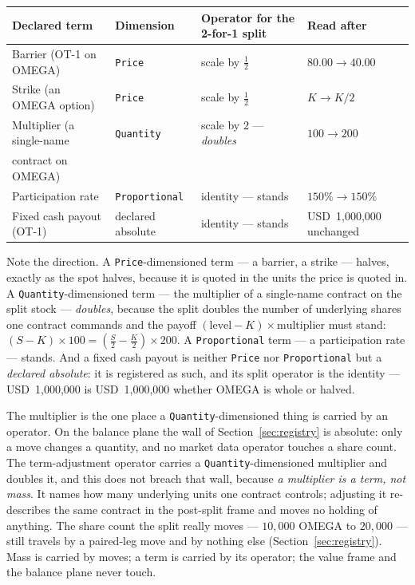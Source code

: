 \documentclass[11pt,a4paper]{article}
\newcommand{\USD}[1]{\mbox{USD~#1}}
\begin{document}
\begin{center}
\begin{tabular}{@{}llll@{}}
\toprule
Declared term & Dimension & Operator for the 2-for-1 split & Read after \\
\midrule
Barrier (OT-1 on OMEGA)          & \texttt{Price}        & scale by $\tfrac12$             & $80.00 \rightarrow 40.00$ \\
Strike (an OMEGA option)         & \texttt{Price}        & scale by $\tfrac12$             & $K \rightarrow K/2$ \\
Multiplier (a single-name        & \texttt{Quantity}     & scale by $2$ --- \emph{doubles} & $100 \rightarrow 200$ \\
\quad contract on OMEGA)         &                       &                                & \\
Participation rate               & \texttt{Proportional} & identity --- stands             & $150\% \rightarrow 150\%$ \\
Fixed cash payout (OT-1)         & declared absolute     & identity --- stands             & \USD{1{,}000{,}000} unchanged \\
\bottomrule
\end{tabular}
\end{center}

Note the direction. A \texttt{Price}-dimensioned term --- a barrier, a strike --- halves,
exactly as the spot halves, because it is quoted in the units the price is quoted in. A
\texttt{Quantity}-dimensioned term --- the multiplier of a single-name contract on the split
stock --- \emph{doubles}, because the split doubles the number of underlying shares one
contract commands and the payoff $(\text{level} - K)\times\text{multiplier}$ must stand:
$(S - K)\times 100 = (\tfrac{S}{2} - \tfrac{K}{2})\times 200$. A \texttt{Proportional} term
--- a participation rate --- stands. And a fixed cash payout is neither \texttt{Price} nor
\texttt{Proportional} but a \emph{declared absolute}: it is registered as such, and its split
operator is the identity --- \USD{1{,}000{,}000} is \USD{1{,}000{,}000} whether OMEGA is whole
or halved.

The multiplier is the one place a \texttt{Quantity}-dimensioned thing is carried by an
operator. On the balance plane the wall of Section~\ref{sec:registry} is absolute: only a
move changes a quantity, and no market data operator touches a share count. The term-adjustment
operator carries a \texttt{Quantity}-dimensioned multiplier and doubles it, and this does not
breach that wall, because \emph{a multiplier is a term, not mass}. It names how many
underlying units one contract controls; adjusting it re-describes the same contract in the
post-split frame and moves no holding of anything. The share count the split really moves ---
$10{,}000$ OMEGA to $20{,}000$ --- still travels by a paired-leg move and by nothing else
(Section~\ref{sec:registry}). Mass is carried by moves; a term is carried by its operator; the
value frame and the balance plane never touch.
\end{document}
